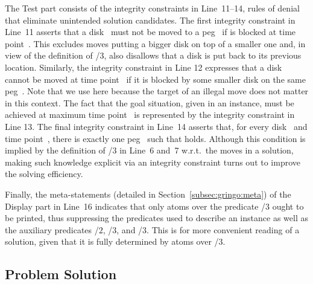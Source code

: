 The Test part consists of the integrity constraints in Line~11--14,
rules of denial that eliminate unintended solution candidates.
The first integrity constraint in Line~11 asserts 
that a disk~ must not be moved to a peg~
if  is blocked at time point~.
This excludes moves putting a bigger disk on top of a smaller one and,
in view of the definition of /$3$,
also disallows that a disk is put back to its previous location.
Similarly, the integrity constraint in Line 12 
expresses that a disk~ cannot be moved at time point~
if it is blocked by some smaller disk on the same peg~.
Note that we use  here because the
target of an illegal move does not matter in this context.
The fact that the goal situation, given in an instance,
must be achieved at maximum time point~
is represented by the integrity constraint in Line 13.
The final integrity constraint in Line~14
asserts that, for every disk~ and time point~, 
there is exactly one peg~ such that
 holds.
Although this condition is implied by the definition of /$3$ in Line~6 and~7
w.r.t.\ the moves in a solution,
making such knowledge explicit via an integrity constraint
turns out to improve the solving efficiency.

Finally, the meta-statements (detailed in Section~\ref{subsec:gringo:meta})
of the Display part in Line~16
indicates that only atoms over the predicate /$3$ ought to be printed,
thus suppressing the predicates used to describe an instance as well as
the auxiliary predicates /$2$, /$3$, and /$3$.
This is for more convenient reading of a solution,
given that it is fully determined by atoms over /$3$.

\subsection{Problem Solution}

